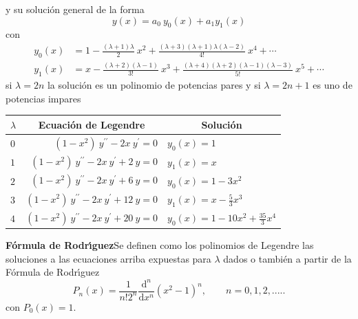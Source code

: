 \documentclass[spanish,notitlepage,letterpaper,12pt]{article}
\begin{document}
y su soluci\'{o}n general de la forma
\[
y(x)=a_{0}\ y_{0}(x)+a_{1}y_{1}(x)
\]
con
\begin{align*}
y_{0}(x)  & =1-\frac{(\lambda+1)\lambda}2\ x^{2}+\frac{(\lambda+3)(\lambda
+1)\lambda(\lambda-2)}{4!}\ x^{4}+\cdots\\
y_{1}(x)  & =x-\frac{(\lambda+2)(\lambda-1)}{3!}\ x^{3}+\frac{(\lambda
+4)(\lambda+2)(\lambda-1)(\lambda-3)}{5!}\ x^{5}+\cdots
\end{align*}
si $\lambda=2n$ la soluci\'{o}n es un polinomio de potencias pares y si
$\lambda=2n+1$ es uno de potencias impares

\begin{center}%
\begin{tabular}
[c]{lcc}\hline\hline
$\lambda$ & Ecuaci\'{o}n de Legendre & Soluci\'{o}n\\\hline\hline
$0$ & \multicolumn{1}{r}{$(1-x^{2})\ y^{\prime\prime}-2x\ y^{\prime}=0$} &
\multicolumn{1}{l}{$y_{0}(x)=1$}\\
$1$ & \multicolumn{1}{r}{$(1-x^{2})\ y^{\prime\prime}-2x\ y^{\prime}+2\ y=0$}%
& \multicolumn{1}{l}{$y_{1}(x)=x$}\\
$2$ & \multicolumn{1}{r}{$(1-x^{2})\ y^{\prime\prime}-2x\ y^{\prime}+6\ y=0$}%
& \multicolumn{1}{l}{$y_{0}(x)=1-3x^{2}$}\\
$3$ & \multicolumn{1}{r}{$(1-x^{2})\ y^{\prime\prime}-2x\ y^{\prime}+12\ y=0
$} & \multicolumn{1}{l}{$y_{1}(x)=x-\frac53x^{3}$}\\
$4$ & \multicolumn{1}{r}{$(1-x^{2})\ y^{\prime\prime}-2x\ y^{\prime}+20\ y=0
$} & \multicolumn{1}{l}{$y_{0}(x)=1-10x^{2}+\frac{35}3x^{4}$}\\\hline\hline
\end{tabular}
\end{center}

\textbf{F\'{o}rmula de Rodr\'{\i}guez}\newline Se definen como los polinomios
de Legendre las soluciones a las ecuaciones arriba expuestas para $\lambda$
dados o tambi\'{e}n a partir de la F\'{o}rmula de Rodr\'{\i}guez
\[
P_{n}(x)=\frac1{n!2^{n}}\frac{\mathrm{d}^{n}}{\mathrm{d}x^{n}}(x^{2}%
-1)^{n},\qquad n=0,1,2,.....
\]
con $P_{0}(x)=1.$
\end{document}
